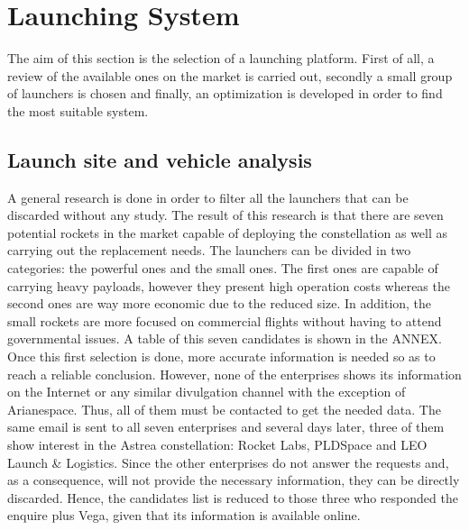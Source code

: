 

\section{Launching System}
The aim of this section is the selection of a launching platform. First of all, a review of the available ones on the market is carried out, secondly a small group of launchers is chosen and finally, an optimization is developed in order to find the most suitable system. 
	\subsection{Launch site and vehicle analysis}
A general research is done in order to filter all the launchers that can be discarded without any study. The result of this research is that there are seven potential rockets in the market capable of deploying the constellation as well as carrying out the replacement needs. The launchers can be divided in two categories: the powerful ones and the small ones. The first ones are capable of carrying heavy payloads, however they present high operation costs whereas the second ones are way more economic due to the reduced size. In addition, the small rockets are more focused on commercial flights without having to attend governmental issues. A table of this seven candidates is shown in the ANNEX.
\newline
Once this first selection is done, more accurate information is needed so as to reach a reliable conclusion. However, none of the enterprises shows its information on the Internet or any similar divulgation channel with the exception of Arianespace. Thus, all of them must be contacted to get the needed data. The same email is sent to all seven enterprises and several days later, three of them show interest in the Astrea constellation: Rocket Labs, PLDSpace and LEO Launch \& Logistics. Since the other enterprises do not answer the requests and, as a consequence, will not provide the necessary information, they can be directly discarded. Hence, the candidates list is reduced to those three who responded the enquire plus Vega, given that its information is available online. 
\newline
